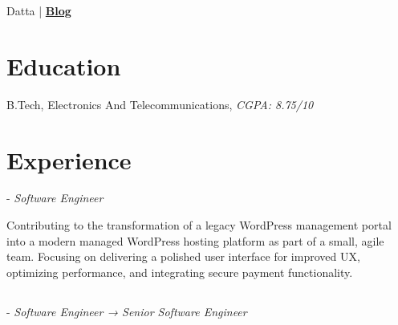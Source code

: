 \documentclass[]{resume}
\begin{document}
     
  
 {Datta} | \href{https://souptik.dev/}{\textbf{Blog}}


%
%
\section{Education}
\raggedright

    \hspace*{\fill}  

    B.Tech, Electronics And Telecommunications, \textit{CGPA: 8.75/10}\hspace*{\fill}

    \sectionsep


       \section{Experience}
       \raggedright

            - \textit{Software Engineer}\hspace*{\fill}  

           Contributing to the transformation of a legacy WordPress management portal into a modern managed WordPress hosting platform as part of a small, agile team. Focusing on delivering a polished user interface for improved UX, optimizing performance, and integrating secure payment functionality.

\subsection{}
         
            - \textit{Software Engineer → Senior Software Engineer}\hspace*{\fill}  
\end{document}
